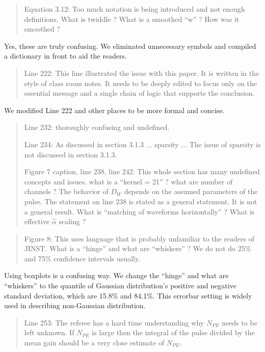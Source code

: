\documentclass[12pt]{article}
\begin{document}
\begin{quote}
Equation 3.12: Too much notation is being introduced and not enough definitions. What is twiddle ? What is a smoothed ``w'' ? How was it smoothed ?
\end{quote}

Yes, these are truly confusing. We eliminated unnecessary symbols and compiled a dictionary in front to aid the readers. 

\begin{quote}
Line 222: This line illustrated the issue with this paper. It is written in the style of class room notes. It needs to be deeply edited to focus only on the essential message and a single chain of logic that supports the conclusion.
\end{quote}

We modified Line 222 and other places to be more formal and concise.

\begin{quote}
Line 232: thoroughly confusing and undefined.

Line 234: As discussed in section 3.1.3 ... sparsity ... The issue of sparsity is not discussed in section 3.1.3.

Figure 7 caption, line 238, line 242: This whole section has many undefined concepts and issues. what is a ``kernel = 21'' ? what are number of channels ? The behavior of $D_W$ depends on the assumed parameters of the pulse. The statement on line 238 is stated as a general statement. It is not a general result. What is ``matching of waveforms horizontally'' ? What is effective $\hat{\alpha}$ scaling ?
\end{quote}


\begin{quote}
Figure 8: This uses language that is probably unfamiliar to the readers of JINST. What is a ``hinge'' and what are ``whiskers'' ? We do not do 25\% and 75\% confidence intervals usually.
\end{quote}

Using boxplots is a confusing way. We change the ``hinge'' and what are ``whiskers'' to the quantile of Gaussian distribution's positive and negative standard deviation, which are 15.8\% and 84.1\%. This errorbar setting is widely used in describing non-Gaussian distribution.

\begin{quote}
Line 253: The referee has a hard time understanding why $N_{PE}$ needs to be left unknown. If $N_{PE}$ is large then the integral of the pulse divided by the mean gain should be a very close estimate of $N_{PE}$. 
\end{quote}
\end{document}
